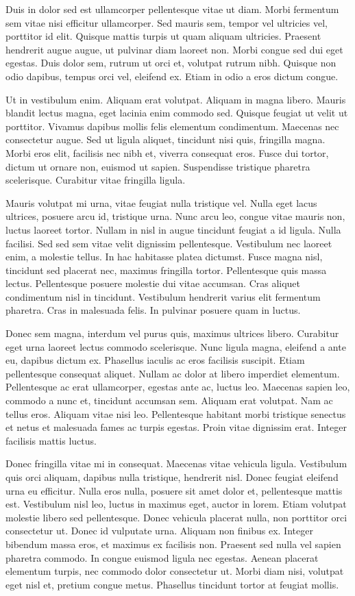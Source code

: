 Duis in dolor sed est ullamcorper pellentesque vitae ut diam. Morbi fermentum sem vitae nisi efficitur ullamcorper. Sed mauris sem, tempor vel ultricies vel, porttitor id elit. Quisque mattis turpis ut quam aliquam ultricies. Praesent hendrerit augue augue, ut pulvinar diam laoreet non. Morbi congue sed dui eget egestas. Duis dolor sem, rutrum ut orci et, volutpat rutrum nibh. Quisque non odio dapibus, tempus orci vel, eleifend ex. Etiam in odio a eros dictum congue.

Ut in vestibulum enim. Aliquam erat volutpat. Aliquam in magna libero. Mauris blandit lectus magna, eget lacinia enim commodo sed. Quisque feugiat ut velit ut porttitor. Vivamus dapibus mollis felis elementum condimentum. Maecenas nec consectetur augue. Sed ut ligula aliquet, tincidunt nisi quis, fringilla magna. Morbi eros elit, facilisis nec nibh et, viverra consequat eros. Fusce dui tortor, dictum ut ornare non, euismod ut sapien. Suspendisse tristique pharetra scelerisque. Curabitur vitae fringilla ligula.

Mauris volutpat mi urna, vitae feugiat nulla tristique vel. Nulla eget lacus ultrices, posuere arcu id, tristique urna. Nunc arcu leo, congue vitae mauris non, luctus laoreet tortor. Nullam in nisl in augue tincidunt feugiat a id ligula. Nulla facilisi. Sed sed sem vitae velit dignissim pellentesque. Vestibulum nec laoreet enim, a molestie tellus. In hac habitasse platea dictumst. Fusce magna nisl, tincidunt sed placerat nec, maximus fringilla tortor. Pellentesque quis massa lectus. Pellentesque posuere molestie dui vitae accumsan. Cras aliquet condimentum nisl in tincidunt. Vestibulum hendrerit varius elit fermentum pharetra. Cras in malesuada felis. In pulvinar posuere quam in luctus.

Donec sem magna, interdum vel purus quis, maximus ultrices libero. Curabitur eget urna laoreet lectus commodo scelerisque. Nunc ligula magna, eleifend a ante eu, dapibus dictum ex. Phasellus iaculis ac eros facilisis suscipit. Etiam pellentesque consequat aliquet. Nullam ac dolor at libero imperdiet elementum. Pellentesque ac erat ullamcorper, egestas ante ac, luctus leo. Maecenas sapien leo, commodo a nunc et, tincidunt accumsan sem. Aliquam erat volutpat. Nam ac tellus eros. Aliquam vitae nisi leo. Pellentesque habitant morbi tristique senectus et netus et malesuada fames ac turpis egestas. Proin vitae dignissim erat. Integer facilisis mattis luctus.

Donec fringilla vitae mi in consequat. Maecenas vitae vehicula ligula. Vestibulum quis orci aliquam, dapibus nulla tristique, hendrerit nisl. Donec feugiat eleifend urna eu efficitur. Nulla eros nulla, posuere sit amet dolor et, pellentesque mattis est. Vestibulum nisl leo, luctus in maximus eget, auctor in lorem. Etiam volutpat molestie libero sed pellentesque. Donec vehicula placerat nulla, non porttitor orci consectetur ut. Donec id vulputate urna. Aliquam non finibus ex. Integer bibendum massa eros, et maximus ex facilisis non. Praesent sed nulla vel sapien pharetra commodo. In congue euismod ligula nec egestas. Aenean placerat elementum turpis, nec commodo dolor consectetur ut. Morbi diam nisi, volutpat eget nisl et, pretium congue metus. Phasellus tincidunt tortor at feugiat mollis.

